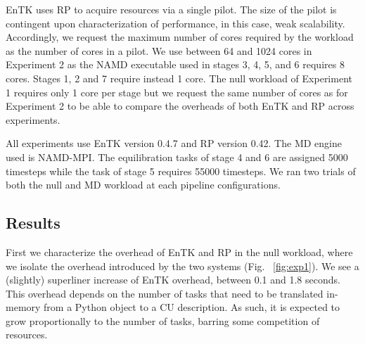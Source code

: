 \documentclass{bmcart}
\def\texttt{[image: ]}
\begin{document}
EnTK uses RP to acquire resources via a single pilot. The size of the pilot
is contingent upon characterization of performance, in this case, weak
scalability. Accordingly, we request the maximum number of cores required by
the workload as the number of cores in a pilot. We use between 64 and 1024
cores in Experiment 2 as the NAMD executable used in stages 3, 4, 5, and 6
requires 8 cores. Stages 1, 2 and 7 require instead 1 core. The null workload
of Experiment 1 requires only 1 core per stage but we request the same number
of cores as for Experiment 2 to be able to compare the overheads of both EnTK
and RP across experiments.

All experiments use EnTK version 0.4.7 and RP version 0.42. The MD engine
used is NAMD-MPI\@. The equilibration tasks of stage 4 and 6 are assigned
5000 timesteps while the task of stage 5 requires 55000 timesteps. We ran two
trials of both the null and MD workload at each pipeline configurations.

\subsection*{Results}\label{ssec:exp_results}



First we characterize the overhead of EnTK and RP in the null workload, where
we isolate the overhead introduced by the two systems
(Fig. ~\ref{fig:exp1}). We see a (slightly) superliner increase of EnTK
overhead, between 0.1 and 1.8 seconds. This overhead depends on the number of
tasks that need to be translated in-memory from a Python object to a CU 
description. As such, it is expected to grow proportionally to the
number of tasks, barring some competition of resources.
\end{document}
